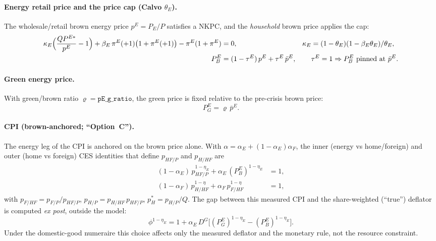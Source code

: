\documentclass[11pt]{article}
\newcommand{\DG}{D^{G}}
\newcommand{\PEB}{P^{E}_{B}}
\newcommand{\PEG}{P^{E}_{G}}
\newcommand{\pE}{p^{E}}
\begin{document}
\paragraph{Energy retail price and the price cap (Calvo $\theta_E$).} The
wholesale/retail brown energy price $\pE=P_E/P$ satisfies a NKPC, and the
\emph{household} brown price applies the cap:
\begin{align}
\kappa_E\Bigl(\frac{Q P^{E*}}{\pE}-1\Bigr)
+\beta_E\,\pi^{E}(+1)\bigl(1+\pi^{E}(+1)\bigr)
-\pi^{E}(1+\pi^{E})&=0,
& \kappa_E&=(1-\theta_E)(1-\beta_E\theta_E)/\theta_E,\\
\PEB &= (1-\tau^{E})\,\pE+\tau^{E}\,\bar\pE,
&& \tau^{E}=1\Rightarrow \PEB\ \text{pinned at }\bar\pE .
\label{eq:cap}
\end{align}

\paragraph{Green energy price.} With green/brown ratio $\varrho=\texttt{pE\_g\_ratio}$,
the green price is fixed relative to the pre-crisis brown price:
\begin{equation}
\PEG=\varrho\,\bar\pE . \label{eq:pEG}
\end{equation}

\paragraph{CPI (brown-anchored; ``Option~C'').} The energy leg of the CPI is
anchored on the brown price alone. With $\alpha=\alpha_E+(1-\alpha_E)\alpha_F$,
the inner (energy vs home/foreign) and outer (home vs foreign) CES identities
that define $p_{HF/P}$ and $p_{H/HF}$ are
\begin{align}
(1-\alpha_E)\,p_{HF/P}^{1-\eta_E}+\alpha_E\,(\PEB)^{1-\eta_E}&=1, \label{eq:innernest}\\
(1-\alpha_F)\,p_{H/HF}^{1-\eta}+\alpha_F\,p_{F/HF}^{1-\eta}&=1, \label{eq:outernest}
\end{align}
with $p_{F/HF}=p_{F/P}/p_{HF/P}$, $p_{H/P}=p_{H/HF}\,p_{HF/P}$, $p_H^{*}=p_{H/P}/Q$.
The gap between this measured CPI and the share-weighted (``true'') deflator is
computed \emph{ex post}, outside the model:
\begin{equation}
\phi^{1-\eta_E}=1+\alpha_E\,\DG\bigl[(\PEG)^{1-\eta_E}-(\PEB)^{1-\eta_E}\bigr].
\end{equation}
Under the domestic-good numeraire this choice affects only the measured deflator
and the monetary rule, not the resource constraint.
\end{document}
